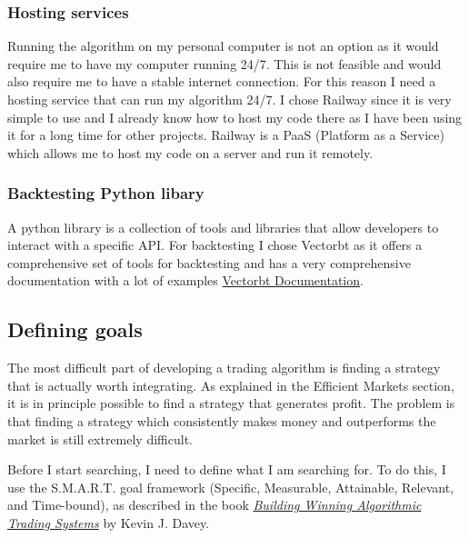 \documentclass[12pt]{article}
\begin{document}
\subsubsection*{Hosting services}
Running the algorithm on my personal computer is not an option as it would require me to have my computer running 24/7. This is not feasible and would also require me to have a stable internet connection. For this reason I need a hosting service that can run my algorithm 24/7. I chose Railway since it is very simple to use and I already know how to host my code there as I have been using it for a long time for other projects. Railway is a PaaS (Platform as a Service) which allows me to host my code on a server and run it remotely.

\subsubsection*{Backtesting Python libary}
A python library is a collection of tools and libraries that allow developers to interact with a specific API. For backtesting I chose Vectorbt as it offers a comprehensive set of tools for backtesting and has a very comprehensive documentation with a lot of examples \href{https://github.com/polakowo/vectorbt}{Vectorbt Documentation}.








\newpage
\subsection{Defining goals}


The most difficult part of developing a trading algorithm is finding a strategy that is actually worth integrating. As explained in the Efficient Markets section, it is in principle possible to find a strategy that generates profit. The problem is that finding a strategy which consistently makes money and outperforms the market is still extremely difficult.

Before I start searching, I need to define what I am searching for. To do this, I use the S.M.A.R.T. goal framework (Specific, Measurable, Attainable, Relevant, and Time-bound), as described in the book \href{https://www.amazon.com/Building-Winning-Algorithmic-Trading-Systems/dp/1118778987}{\textit{Building Winning Algorithmic Trading Systems}} by Kevin J. Davey.
\end{document}
